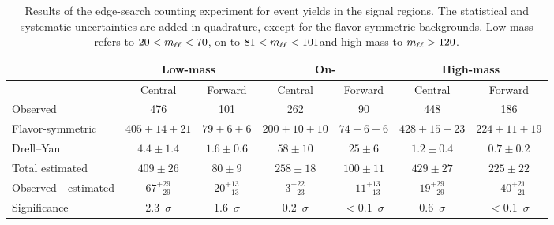 
\begin{table}[hbtp]
 \renewcommand{\arraystretch}{1.3}
 \setlength{\belowcaptionskip}{6pt}
 \scriptsize
 \centering
 \caption{Results of the edge-search counting experiment for event yields in the signal regions.
     The statistical and systematic uncertainties are added in quadrature, except for the flavor-symmetric backgrounds.
     Low-mass refers to $20 < m_{\ell\ell} < 70$\GeV, on-\Z to  $81 < m_{\ell\ell} < 101$\GeV and high-mass to $m_{\ell\ell} > 120$\GeV.
     }
  \label{tab:METresults2012MM}
  \begin{tabular}{l| cc | cc | cc}
    \hline
    \hline
    							& \multicolumn{2}{c}{Low-mass} & \multicolumn{2}{c}{On-\Z} & \multicolumn{2}{c}{High-mass} \\ 

    \hline
                                &  Central        & Forward  &  Central  & Forward   &  Central        & Forward \\ 

    \hline
        Observed       &  476                   & 101              &  262            &  90       &   448           &   186    \\

    \hline
        Flavor-symmetric    & $405\pm14\pm21$        & $79\pm6\pm6$  &  $200\pm10\pm10$ & $74\pm6\pm6$ & $428\pm15\pm23$ & $224\pm11\pm19$ \\

            Drell--Yan          & $4.4\pm1.4$            & $1.6\pm0.6$      & $58\pm10$ & $25\pm6$ & $1.2\pm0.4$ & $0.7\pm0.2$ \\

    \hline
            Total estimated          & $409\pm26$            & $80\pm9$      & $258\pm18$ & $100\pm11$ & $429\pm27$ & $225\pm22$ \\

    \hline
         Observed - estimated  & $67^{+29}_{-29}$      & $20^{+13}_{-13}$ & $3^{+22}_{-23} $ & $-11^{+13}_{-13}$ & $19^{+29}_{-29}$ & $-40^{+21}_{-21} $ \\ 

    \hline
   Significance      & 2.3~$\sigma$    &  1.6~$\sigma$  & 0.2~$\sigma$ & $<$0.1~$\sigma$ & 0.6~$\sigma$ & $<$0.1~$\sigma$ \\ 

   \hline
    \hline
  \end{tabular}
\end{table}


